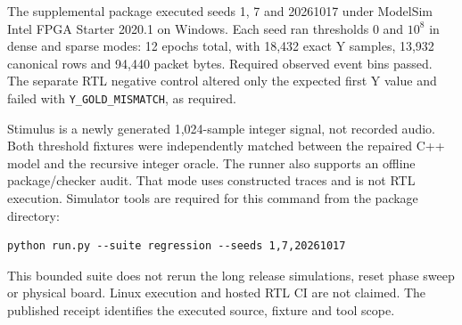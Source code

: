 The supplemental package executed seeds 1, 7 and 20261017 under ModelSim Intel FPGA Starter 2020.1 on Windows. Each seed ran thresholds 0 and $10^8$ in dense and sparse modes: 12 epochs total, with 18,432 exact Y samples, 13,932 canonical rows and 94,440 packet bytes. Required observed event bins passed. The separate RTL negative control altered only the expected first Y value and failed with \texttt{Y\_GOLD\_MISMATCH}, as required.

Stimulus is a newly generated 1,024-sample integer signal, not recorded audio. Both threshold fixtures were independently matched between the repaired C++ model and the recursive integer oracle. The runner also supports an offline package/checker audit. That mode uses constructed traces and is not RTL execution. Simulator tools are required for this command from the package directory:
\begin{lstlisting}
python run.py --suite regression --seeds 1,7,20261017
\end{lstlisting}
This bounded suite does not rerun the long release simulations, reset phase sweep or physical board. Linux execution and hosted RTL CI are not claimed. The published receipt identifies the executed source, fixture and tool scope.
